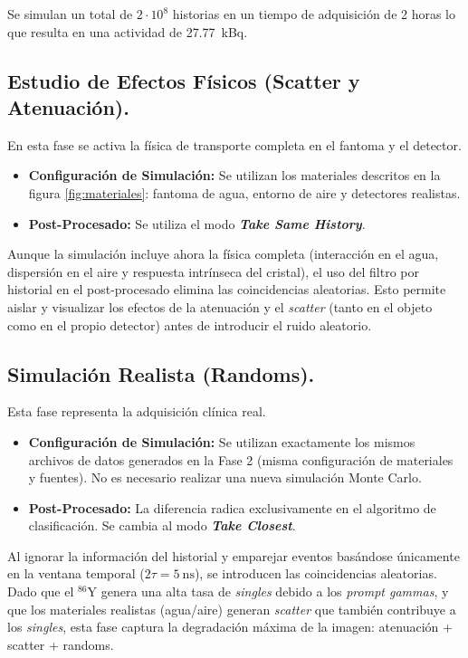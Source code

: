 Se simulan un total de $2\cdot 10^8$ historias en un tiempo de adquisición de 2 horas lo que resulta en una actividad de \SI{27.77}{\kilo\becquerel}.

\subsection{Estudio de Efectos Físicos (Scatter y Atenuación).}
\label{subsec:fase2}

En esta fase se activa la física de transporte completa en el fantoma y el detector.

\begin{itemize}
  \item \textbf{Configuración de Simulación:} Se utilizan los materiales descritos en la figura \ref{fig:materiales}: fantoma de agua, entorno de aire y detectores realistas.
  \item \textbf{Post-Procesado:} Se utiliza el modo \textbf{\textit{Take Same History}}.
\end{itemize}

Aunque la simulación incluye ahora la física completa (interacción en el agua, dispersión en el aire y respuesta intrínseca del cristal), el uso del filtro por historial en el post-procesado elimina las coincidencias aleatorias. Esto permite aislar y visualizar los efectos de la atenuación y el \textit{scatter} (tanto en el objeto como en el propio detector) antes de introducir el ruido aleatorio.


\subsection{Simulación Realista (Randoms).}
\label{subsec:fase3}

Esta fase representa la adquisición clínica real.

\begin{itemize}
  \item \textbf{Configuración de Simulación:} Se utilizan exactamente los mismos archivos de datos generados en la Fase 2 (misma configuración de materiales y fuentes). No es necesario realizar una nueva simulación Monte Carlo.
  \item \textbf{Post-Procesado:} La diferencia radica exclusivamente en el algoritmo de clasificación. Se cambia al modo \textbf{\textit{Take Closest}}.
\end{itemize}

Al ignorar la información del historial y emparejar eventos basándose únicamente en la ventana temporal ($2\tau = \SI{5}{\nano\second}$), se introducen las coincidencias aleatorias. Dado que el $^{86}\text{Y}$ genera una alta tasa de \textit{singles} debido a los \textit{prompt gammas}, y que los materiales realistas (agua/aire) generan \textit{scatter} que también contribuye a los \textit{singles}, esta fase captura la degradación máxima de la imagen: atenuación + scatter + randoms.


